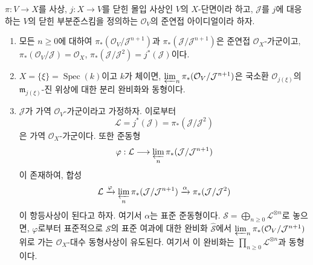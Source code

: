 \begin{lemma}[8.10.1]
\label{II.8.10.1-ko}
$\pi:V\to X$를 사상, $j:X\to V$를 닫힌 몰입 사상인 $V$의
$X$-단면이라 하고, $\mathcal{J}$를 $j$에 대응하는 $V$의 닫힌
부분준스킴을 정의하는 $\mathcal{O}_V$의 준연접 아이디얼이라 하자.
\begin{enumerate}
  \item[\rm{(i)}] 모든 $n\geqslant 0$에 대하여
  $\pi_*(\mathcal{O}_V/\mathcal{J}^{n+1})$과
  $\pi_*(\mathcal{J}/\mathcal{J}^{n+1})$은 준연접
  $\mathcal{O}_X$-가군이고,
  $\pi_*(\mathcal{O}_V/\mathcal{J})=\mathcal{O}_X$,
  $\pi_*(\mathcal{J}/\mathcal{J}^2)=j^*(\mathcal{J})$이다.
  \item[\rm{(ii)}] $X=\{\xi\}=\operatorname{Spec}(k)$이고 $k$가
  체이면, $\varprojlim_n\pi_*(\mathcal{O}_V/\mathcal{J}^{n+1})$은
  국소환 $\mathcal{O}_{j(\xi)}$의
  $\mathfrak{m}_{j(\xi)}$-진 위상에 대한 분리 완비화와 동형이다.
  \item[\rm{(iii)}] $\mathcal{J}$가 가역 $\mathcal{O}_V$-가군이라고
  가정하자. 이로부터
  \[
    \mathcal{L}=j^*(\mathcal{J})=
    \pi_*(\mathcal{J}/\mathcal{J}^2)
  \]
  은 가역 $\mathcal{O}_X$-가군이다. 또한 준동형
  \[
    \varphi:\mathcal{L}\longrightarrow
    \varprojlim_n\pi_*(\mathcal{J}/\mathcal{J}^{n+1})
  \]
  이 존재하여, 합성
  \[
    \mathcal{L}\xrightarrow{\varphi}
    \varprojlim_n\pi_*(\mathcal{J}/\mathcal{J}^{n+1})
    \xrightarrow{\alpha}\pi_*(\mathcal{J}/\mathcal{J}^2)
  \]
  이 항등사상이 된다고 하자. 여기서 $\alpha$는 표준 준동형이다.
  $\mathcal{S}=\bigoplus_{n\geqslant0}\mathcal{L}^{\otimes n}$로 놓으면,
  $\varphi$로부터 표준적으로 $\mathcal{S}$의 표준 여과에 대한 완비화
  $\widehat{\mathcal{S}}$에서
  $\varprojlim_n\pi_*(\mathcal{O}_V/\mathcal{J}^{n+1})$ 위로 가는
  $\mathcal{O}_X$-대수 동형사상이 유도된다. 여기서 이 완비화는
  $\prod_{n\geqslant0}\mathcal{L}^{\otimes n}$과 동형이다.
\end{enumerate}
\end{lemma}

